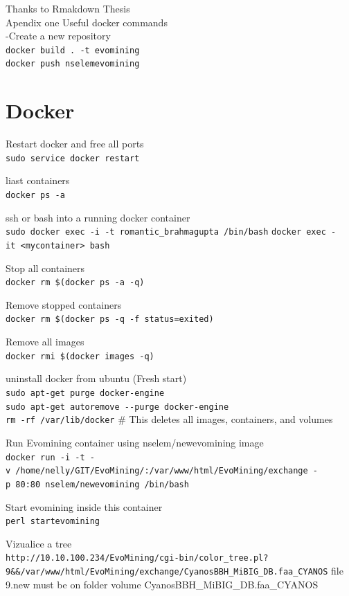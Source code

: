 \documentclass[12pt,twoside]{reedthesis}
\begin{document}
  Thanks to Rmakdown Thesis\\
  Apendix one Useful docker commands\\
  -Create a new repository\\
  \texttt{docker\ build\ .\ -t\ evomining}\\
  \texttt{docker\ push\ nselemevomining}
  
  \section{Docker}\label{docker}
  
  Restart docker and free all ports\\
  \texttt{sudo\ service\ docker\ restart}
  
  liast containers\\
  \texttt{docker\ ps\ -a}
  
  ssh or bash into a running docker container\\
  \texttt{sudo\ docker\ exec\ -i\ -t\ romantic\_brahmagupta\ /bin/bash}
  \texttt{docker\ exec\ -it\ \textless{}mycontainer\textgreater{}\ bash}
  
  Stop all containers\\
  \texttt{docker\ rm\ \$(docker\ ps\ -a\ -q)}
  
  Remove stopped containers\\
  \texttt{docker\ rm\ \$(docker\ ps\ -q\ -f\ status=exited)}
  
  Remove all images\\
  \texttt{docker\ rmi\ \$(docker\ images\ -q)}
  
  uninstall docker from ubuntu (Fresh start)\\
  \texttt{sudo\ apt-get\ purge\ docker-engine}\\
  \texttt{sudo\ apt-get\ autoremove\ -\/-purge\ docker-engine}\\
  \texttt{rm\ -rf\ /var/lib/docker} \# This deletes all images,
  containers, and volumes
  
  Run Evomining container using nselem/newevomining image\\
  \texttt{docker\ run\ -i\ -t\ -v\ /home/nelly/GIT/EvoMining/:/var/www/html/EvoMining/exchange\ -p\ 80:80\ nselem/newevomining\ /bin/bash}
  
  Start evomining inside this container\\
  \texttt{perl\ startevomining}
  
  Vizualice a tree\\
  \texttt{http://10.10.100.234/EvoMining/cgi-bin/color\_tree.pl?9\&\&/var/www/html/EvoMining/exchange/CyanosBBH\_MiBIG\_DB.faa\_CYANOS}
  file 9.new must be on folder volume CyanosBBH\_MiBIG\_DB.faa\_CYANOS
  
\end{document}
